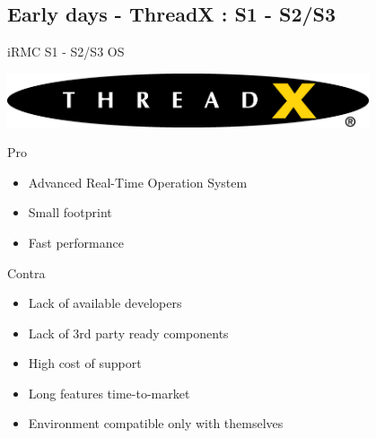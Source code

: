 \documentclass{beamer}
\begin{document}
  \subsection{Early days - ThreadX : S1 - S2/S3}
  \begin{frame}{iRMC S1 - S2/S3 OS}
	  \begin{center}
		  \includegraphics[width=0.8\textwidth]{logo/threadx.jpg}
	  \end{center}
	  \begin{block}{Pro}
		  \begin{itemize}
			  \item Advanced Real-Time Operation System
			  \item Small footprint
			  \item Fast performance
		  \end{itemize}
	  \end{block}
	  \pause
	  
	  \begin{block}{Contra}
		  \begin{itemize}
			  \item Lack of available developers
			  \item Lack of 3rd party ready components
			  \item High cost of support
			  \item Long features time-to-market
			  \item Environment compatible only with themselves
		  \end{itemize}
	  \end{block}

  \end{frame}
\end{document}

